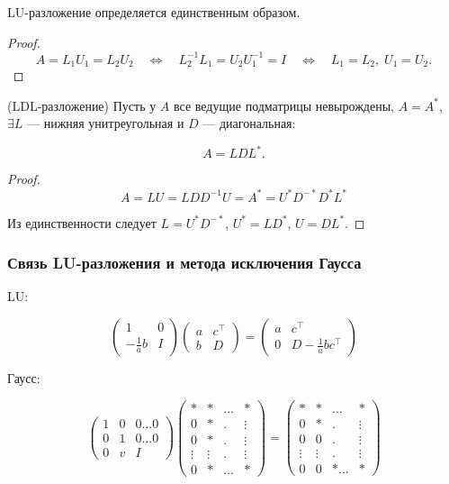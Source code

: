 \begin{point}
    LU-разложение определяется единственным образом.
\end{point}

\begin{proof}
    \[
        A = L_1 U_1 = L_2 U_2 \quad\Leftrightarrow\quad
        L_2^{-1} L_1 = U_2 U_1^{-1} = I \quad\Leftrightarrow\quad
        L_1 = L_2,\; U_1 = U_2.
    \]
\end{proof}

\begin{point}
    (LDL-разложение) Пусть у $A$ все ведущие подматрицы невырождены, $A = A^*$,
    $\exists L$ --- нижняя унитреугольная и $D$ --- диагональная:

    \[
        A = L D L^*.
    \]
\end{point}

\begin{proof}
    \[
        A = L U = L D D^{-1} U = A^* = U^* D^{-*} D^* L^*
    \]

    Из единственности следует $L = U^* D^{-*}$, $U^* = L D^*$, $U = D L^*$.
\end{proof}

\subsubsection{Связь LU-разложения и метода исключения Гаусса}

LU:

\[
    \begin{pmatrix} 1 & 0 \\ -\frac{1}{a}b & I \end{pmatrix}
    \begin{pmatrix} a & c^\top \\ b & D \end{pmatrix}
    = \begin{pmatrix} a & c^\top \\ 0 & D - \frac{1}{a} b c^\top \end{pmatrix}
\]

Гаусс:

\[
    \begin{pmatrix}
        1 & 0 & 0 \dots 0 \\
        0 & 1 & 0 \dots 0 \\
        0 & v & I
    \end{pmatrix}
    \begin{pmatrix}
        * & * & \dots & * \\
        0 & * & . & \vdots \\
        0 & * & . & \vdots \\
        \vdots & \vdots & . & \vdots \\
        0 & * & \dots & *
    \end{pmatrix}
    = \begin{pmatrix}
        * & * & \dots & * \\
        0 & * & . & \vdots \\
        0 & 0 & . & \vdots \\
        \vdots & \vdots & . & \vdots \\
        0 & 0 & *\dots & *
    \end{pmatrix}
\]

